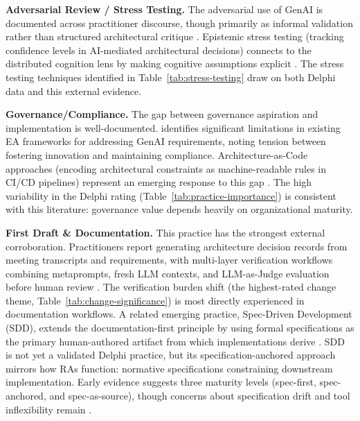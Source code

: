 \textbf{Adversarial Review / Stress Testing.} The adversarial use of GenAI is
documented across practitioner discourse, though primarily as informal validation
rather than structured architectural critique
\parencite{lee_devils_advocate_2025, stanimirovic_ai_sparring_2026}. Epistemic
stress testing (tracking confidence levels in AI-mediated architectural
decisions) connects to the distributed cognition lens by making cognitive
assumptions explicit \parencite{gilda_epistemic_status_2026}. The stress testing
techniques identified in Table~\ref{tab:stress-testing} draw on both Delphi data
and this external evidence.

\textbf{Governance/Compliance.} The gap between governance aspiration and
implementation is well-documented.
\textcite{ettinger_ea_dynamic_capability_2025} identifies significant
limitations in existing EA frameworks for addressing GenAI requirements, noting
tension between fostering innovation and maintaining compliance.
Architecture-as-Code approaches (encoding architectural constraints as
machine-readable rules in CI/CD pipelines) represent an emerging response to this
gap \parencite{bucaioni_architecture_as_code_2025}. The high variability in the Delphi rating
(Table~\ref{tab:practice-importance}) is consistent with this literature:
governance value depends heavily on organizational maturity.

\textbf{First Draft \& Documentation.} This practice has the strongest external
corroboration. Practitioners report generating architecture decision records from
meeting transcripts and requirements, with multi-layer verification workflows
combining metaprompts, fresh LLM contexts, and LLM-as-Judge evaluation before
human review \parencite{banh_affordance_genai_ea_2025}. The verification burden
shift (the highest-rated change theme,
Table~\ref{tab:change-significance}) is most directly experienced in
documentation workflows. A related emerging practice, Spec-Driven Development
(SDD), extends the documentation-first principle by using formal specifications
as the primary human-authored artifact from which implementations derive
\parencite{piskala_spec_driven_dev_2026}. SDD is not yet a validated Delphi
practice, but its specification-anchored approach mirrors how RAs function:
normative specifications constraining downstream implementation. Early evidence
suggests three maturity levels (spec-first, spec-anchored, and spec-as-source),
though concerns about specification drift and tool inflexibility remain
\parencite[sec.~IX]{piskala_spec_driven_dev_2026}.


